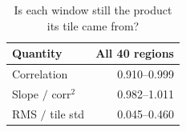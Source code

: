 \begin{table}[t]
\centering
\caption{Is each window still the product its tile came from?}
\label{tab:window_radiometry}
\footnotesize
\begin{tabular}{@{}lr@{}}
\toprule
Quantity & All 40 regions \\
\midrule
Correlation & 0.910--0.999 \\
Slope $/$ corr$^2$ & 0.982--1.011 \\
RMS $/$ tile std & 0.045--0.460 \\
\bottomrule
\end{tabular}
\end{table}
